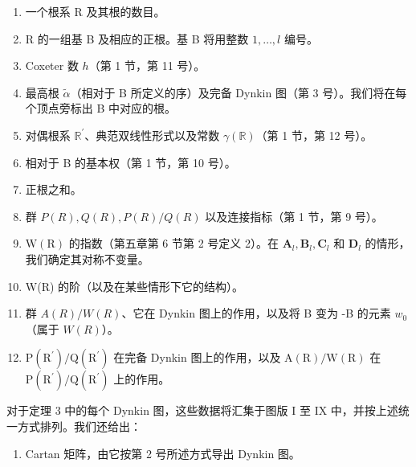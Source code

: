 \begin{enumerate}
\def\labelenumi{(\Roman{enumi})}
\item
  一个根系 R 及其根的数目。
\item
  R 的一组基 B 及相应的正根。基 B 将用整数 \(1,\ldots,l\) 编号。
\item
  Coxeter 数 \(h\)（第 1 节，第 11 号）。
\item
  最高根 \(\tilde{\alpha}\)（相对于 B 所定义的序）及完备 Dynkin 图（第 3 号）。我们将在每个顶点旁标出 B 中对应的根。
\item
  对偶根系 \(\mathbb{R}^{\prime}\)、典范双线性形式以及常数 \(\gamma(\mathbb{R})\)（第 1 节，第 12 号）。
\item
  相对于 B 的基本权（第 1 节，第 10 号）。
\item
  正根之和。
\item
  群 \(P(R), Q(R), P(R)/Q(R)\) 以及连接指标（第 1 节，第 9 号）。
\item
  \(\mathrm{W}(\mathrm{R})\) 的指数（第五章第 6 节第 2 号定义 2）。在 \(\mathbf{A}_l, \mathbf{B}_l, \mathbf{C}_l\) 和 \(\mathbf{D}_l\) 的情形，我们确定其对称不变量。
\item
  W(R) 的阶（以及在某些情形下它的结构）。
\item
  群 \(A(R)/W(R)\)、它在 Dynkin 图上的作用，以及将 B 变为 -B 的元素 \(w_{0}\)（属于 \(W(R)\)）。
\item
  \(\mathrm{P}(\mathrm{R}^{\prime})/\mathrm{Q}(\mathrm{R}^{\prime})\) 在完备 Dynkin 图上的作用，以及 \(\mathrm{A}(\mathrm{R})/\mathrm{W}(\mathrm{R})\) 在 \(\mathrm{P}(\mathrm{R}^{\prime})/\mathrm{Q}(\mathrm{R}^{\prime})\) 上的作用。
\end{enumerate}

对于定理 3 中的每个 Dynkin 图，这些数据将汇集于图版 I 至 IX 中，并按上述统一方式排列。我们还给出：

\begin{enumerate}
\def\labelenumi{(\Roman{enumi})}
\setcounter{enumi}{12}
\tightlist
\item
  Cartan 矩阵，由它按第 2 号所述方式导出 Dynkin 图。
\end{enumerate}

